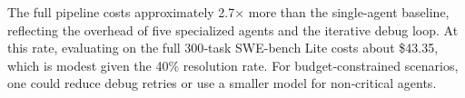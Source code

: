 The full pipeline costs approximately 2.7× more than the single-agent baseline, reflecting the overhead of five specialized agents and the iterative debug loop. At this rate, evaluating on the full 300‑task SWE-bench Lite costs about \$43.35, which is modest given the 40\% resolution rate. For budget‑constrained scenarios, one could reduce debug retries or use a smaller model for non‑critical agents.